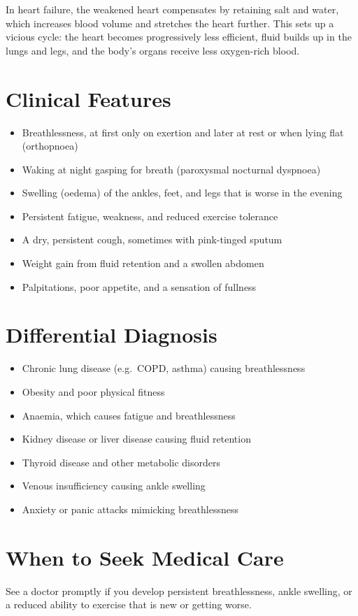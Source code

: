 In heart failure, the weakened heart compensates by retaining salt and water, which increases blood volume and stretches the heart further. This sets up a vicious cycle: the heart becomes progressively less efficient, fluid builds up in the lungs and legs, and the body's organs receive less oxygen-rich blood.

\section*{Clinical Features}
\begin{itemize}
    \item Breathlessness, at first only on exertion and later at rest or when lying flat (orthopnoea)
    \item Waking at night gasping for breath (paroxysmal nocturnal dyspnoea)
    \item Swelling (oedema) of the ankles, feet, and legs that is worse in the evening
    \item Persistent fatigue, weakness, and reduced exercise tolerance
    \item A dry, persistent cough, sometimes with pink-tinged sputum
    \item Weight gain from fluid retention and a swollen abdomen
    \item Palpitations, poor appetite, and a sensation of fullness
\end{itemize}

\section*{Differential Diagnosis}
\begin{itemize}
    \item Chronic lung disease (e.g.\ COPD, asthma) causing breathlessness
    \item Obesity and poor physical fitness
    \item Anaemia, which causes fatigue and breathlessness
    \item Kidney disease or liver disease causing fluid retention
    \item Thyroid disease and other metabolic disorders
    \item Venous insufficiency causing ankle swelling
    \item Anxiety or panic attacks mimicking breathlessness
\end{itemize}

\section*{When to Seek Medical Care}
See a doctor promptly if you develop persistent breathlessness, ankle swelling, or a reduced ability to exercise that is new or getting worse.

